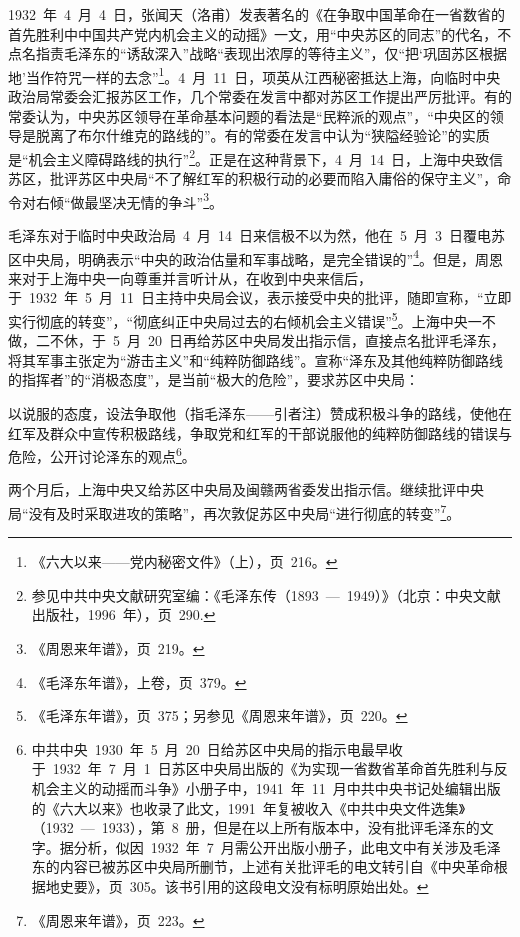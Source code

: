 1932~年~4~月~4~日，张闻天（洛甫）发表著名的《在争取中国革命在一省数省的首先胜利中中国共产党内机会主义的动摇》一文，用“中央苏区的同志”的代名，不点名指责毛泽东的“诱敌深入”战略“表现出浓厚的等待主义”，仅“把‘巩固苏区根据地’当作符咒一样的去念”\footnote{《六大以来——党内秘密文件》（上），页~216。}。4~月~11~日，项英从江西秘密抵达上海，向临时中央政治局常委会汇报苏区工作，几个常委在发言中都对苏区工作提出严厉批评。有的常委认为，中央苏区领导在革命基本问题的看法是“民粹派的观点”，“中央区的领导是脱离了布尔什维克的路线的”。有的常委在发言中认为“狭隘经验论”的实质是“机会主义障碍路线的执行”\footnote{参见中共中央文献研究室编：《毛泽东传（1893~—~1949）》（北京：中央文献出版社，1996~年），页~290.}。正是在这种背景下，4~月~14~日，上海中央致信苏区，批评苏区中央局“不了解红军的积极行动的必要而陷入庸俗的保守主义”，命令对右倾“做最坚决无情的争斗”\footnote{《周恩来年谱》，页~219。}。

毛泽东对于临时中央政治局~4~月~14~日来信极不以为然，他在~5~月~3~日覆电苏区中央局，明确表示“中央的政治估量和军事战略，是完全错误的”\footnote{《毛泽东年谱》，上卷，页~379。}。但是，周恩来对于上海中央一向尊重并言听计从，在收到中央来信后，于~1932~年~5~月~11~日主持中央局会议，表示接受中央的批评，随即宣称，“立即实行彻底的转变”，“彻底纠正中央局过去的右倾机会主义错误”\footnote{《毛泽东年谱》，页~375；另参见《周恩来年谱》，页~220。}。上海中央一不做，二不休，于~5~月~20~日再给苏区中央局发出指示信，直接点名批评毛泽东，将其军事主张定为“游击主义”和“纯粹防御路线”。宣称“泽东及其他纯粹防御路线的指挥者”的“消极态度”，是当前“极大的危险”，要求苏区中央局：

\begin{quoting}
以说服的态度，设法争取他（指毛泽东——引者注）赞成积极斗争的路线，使他在红军及群众中宣传积极路线，争取党和红军的干部说服他的纯粹防御路线的错误与危险，公开讨论泽东的观点\footnote{中共中央~1930~年~5~月~20~日给苏区中央局的指示电最早收于~1932~年~7~月~1~日苏区中央局出版的《为实现一省数省革命首先胜利与反机会主义的动摇而斗争》小册子中，1941~年~11~月中共中央书记处编辑出版的《六大以来》也收录了此文，1991~年复被收入《中共中央文件选集》（1932~—~1933），第~8~册，但是在以上所有版本中，没有批评毛泽东的文字。据分析，似因~1932~年~7~月需公开出版小册子，此电文中有关涉及毛泽东的内容已被苏区中央局所删节，上述有关批评毛的电文转引自《中央革命根据地史要》，页~305。该书引用的这段电文没有标明原始出处。}。
\end{quoting}

两个月后，上海中央又给苏区中央局及闽赣两省委发出指示信。继续批评中央局“没有及时采取进攻的策略”，再次敦促苏区中央局“进行彻底的转变”\footnote{《周恩来年谱》，页~223。}。

